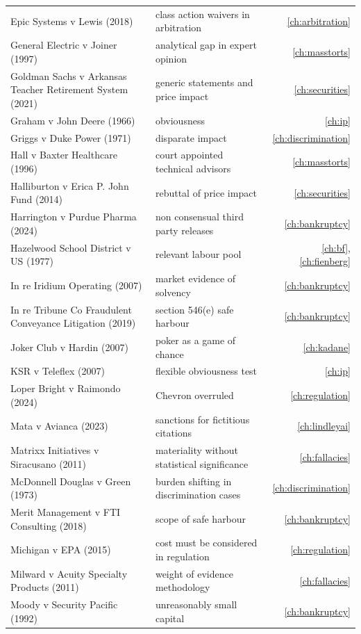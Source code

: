 \begin{longtable}{>{\raggedright\arraybackslash}p{3.7cm} >{\raggedright\arraybackslash}p{5.6cm} r}
Epic Systems v Lewis (2018) & class action waivers in arbitration & \ref{ch:arbitration}\\
General Electric v Joiner (1997) & analytical gap in expert opinion & \ref{ch:masstorts}\\
Goldman Sachs v Arkansas Teacher Retirement System (2021) & generic statements and price impact & \ref{ch:securities}\\
Graham v John Deere (1966) & obviousness & \ref{ch:ip}\\
Griggs v Duke Power (1971) & disparate impact & \ref{ch:discrimination}\\
Hall v Baxter Healthcare (1996) & court appointed technical advisors & \ref{ch:masstorts}\\
Halliburton v Erica P. John Fund (2014) & rebuttal of price impact & \ref{ch:securities}\\
Harrington v Purdue Pharma (2024) & non consensual third party releases & \ref{ch:bankruptcy}\\
Hazelwood School District v US (1977) & relevant labour pool & \ref{ch:bf}, \ref{ch:fienberg}\\
In re Iridium Operating (2007) & market evidence of solvency & \ref{ch:bankruptcy}\\
In re Tribune Co Fraudulent Conveyance Litigation (2019) & section 546(e) safe harbour & \ref{ch:bankruptcy}\\
Joker Club v Hardin (2007) & poker as a game of chance & \ref{ch:kadane}\\
KSR v Teleflex (2007) & flexible obviousness test & \ref{ch:ip}\\
Loper Bright v Raimondo (2024) & Chevron overruled & \ref{ch:regulation}\\
Mata v Avianca (2023) & sanctions for fictitious citations & \ref{ch:lindleyai}\\
Matrixx Initiatives v Siracusano (2011) & materiality without statistical significance & \ref{ch:fallacies}\\
McDonnell Douglas v Green (1973) & burden shifting in discrimination cases & \ref{ch:discrimination}\\
Merit Management v FTI Consulting (2018) & scope of safe harbour & \ref{ch:bankruptcy}\\
Michigan v EPA (2015) & cost must be considered in regulation & \ref{ch:regulation}\\
Milward v Acuity Specialty Products (2011) & weight of evidence methodology & \ref{ch:fallacies}\\
Moody v Security Pacific (1992) & unreasonably small capital & \ref{ch:bankruptcy}\\

\end{longtable}
